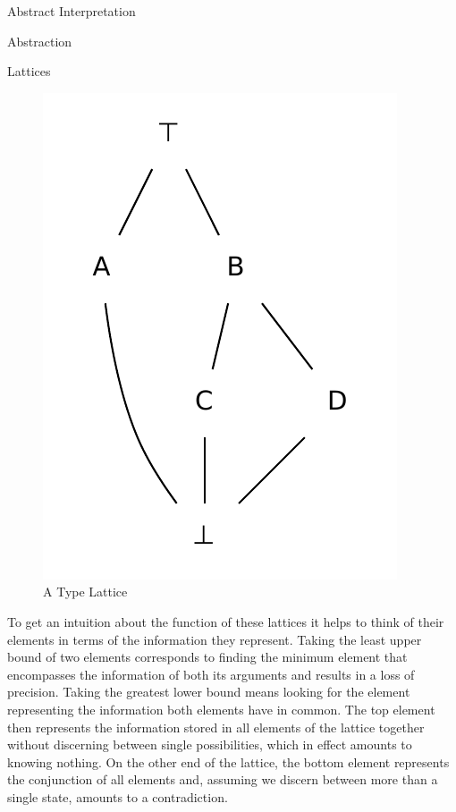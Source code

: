 \begin{chapter}{Abstract Interpretation}
\begin{section}{Abstraction}
\begin{subsection}{Lattices}
\begin{example}
				\begin{figure}
					\centering
					\includegraphics[scale=0.8]{Graphs/TypeLattice.pdf}
					\caption{A Type Lattice}
					\label{figure:typelattice}
				\end{figure}
			\end{example}

			To get an intuition about the function of these lattices it helps to think of their elements in terms of the information they represent. Taking the least upper bound of two elements corresponds to finding the minimum element that encompasses the information of both its arguments and results in a loss of precision. Taking the greatest lower bound means looking for the element representing the information both elements have in common. The top element then represents the information stored in all elements of the lattice together without discerning between single possibilities, which in effect amounts to knowing nothing. On the other end of the lattice, the bottom element represents the conjunction of all elements and, assuming we discern between more than a single state, amounts to a contradiction.
		\end{subsection}



\end{section}
\end{chapter}
